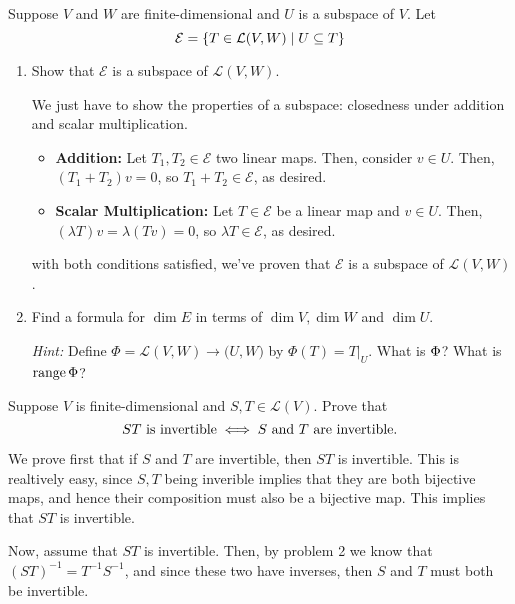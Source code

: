 \documentclass[10pt]{article}
\begin{document}
	\begin{problem}
		Suppose \( V \) and \( W \) are finite-dimensional and \( U \) is a subspace of \( V \). 
		Let 
		\[
		\mathcal E = \{T \in \mathcal L(V, W) \mid U \subseteq \null T\} 
		\] 
		\begin{enumerate}[label=\alph*)]
			\item Show that \( \mathcal E \) is a subspace of \( \mathcal L(V, W) \). 

				\begin{solution}
					We just have to show the properties of a subspace: closedness under addition and scalar 
					multiplication.
					\begin{itemize}
						\item \textbf{Addition:} Let \( T_1, T_2 \in \mathcal E\) two linear maps. Then, 
							consider \( v \in U \). Then, \( (T_1 + T_2)v = 0 \), so  \( T_1 + T_2 \in \mathcal E \), 
							as desired. 
						\item \textbf{Scalar Multiplication:} Let \( T \in \mathcal E\) be a linear map and 
							\( v \in U \). Then, \( (\lambda T)v = \lambda (Tv) = 0 \), so 
							\( \lambda T \in \mathcal E \), as desired. 
					\end{itemize}
					with both conditions satisfied, we've proven that \( \mathcal E \) is a subspace of 
					\( \mathcal L(V, W) \).
				\end{solution}
			\item Find a formula for \( \dim E \) in terms of \( \dim V, \dim W \) and \( \dim U \). 
				
				\textit{Hint:} Define \( \Phi = \mathcal L(V, W) \to \mathcal (U, W) \) by 
				\( \Phi(T) = T\vert_U \). What is \( \null \Phi \)? What is \( \operatorname*{range} \Phi \)? 

				\begin{solution}
				\end{solution}
		\end{enumerate}
	\end{problem}

	\begin{problem}
		Suppose \( V \) is finite-dimensional and \( S, T \in \mathcal L(V) \). Prove that 
		\[
		\text{\( ST \) is invertible} \iff \text{\( S \) and \( T \) are invertible.}
		\] 
	\end{problem}

	\begin{solution}
		We prove first that if \( S \) and \( T \) are invertible, then \( ST  \) is invertible. This is realtively 
		easy, since \( S, T \) being inverible implies that they are both bijective maps, and hence their 
		composition must also be a bijective map. This implies that \( ST \) is invertible.  

		Now, assume that \( ST  \) is invertible. Then, by problem 2 we know that \( (ST)^{-1} = T^{-1} S^{-1} \), 
		and since these two have inverses, then \( S \) and \( T \) must both be invertible.  
	\end{solution}
\end{document}
